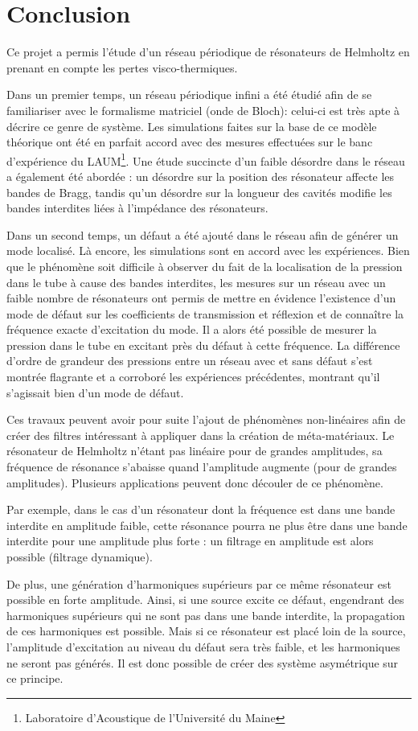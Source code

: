 \chapter{Conclusion}

Ce projet a permis l'étude d'un réseau périodique de résonateurs de Helmholtz en prenant en compte les pertes visco-thermiques. 

Dans un premier temps, un réseau périodique infini a été étudié afin de se familiariser avec le formalisme matriciel (onde de Bloch): celui-ci est très apte à décrire ce genre de système. Les simulations faites sur la base de ce modèle théorique ont été en parfait accord avec des mesures effectuées sur le banc d'expérience du LAUM\footnote{\samepage Laboratoire d'Acoustique de l'Université du Maine}. Une étude succincte d'un faible désordre dans le réseau a également été abordée : un désordre sur la position des résonateur affecte les bandes de Bragg, tandis qu'un désordre sur la longueur des cavités modifie les bandes interdites liées à l'impédance des résonateurs.

 
Dans un second temps, un défaut a été ajouté dans le réseau afin de générer un mode localisé. Là encore, les simulations sont en accord avec les expériences. Bien que le phénomène soit difficile à observer du fait de la localisation de la pression dans le tube à cause des bandes interdites, les mesures sur un réseau avec un faible nombre de résonateurs ont permis de mettre en évidence l’existence d'un mode de défaut sur les coefficients de transmission et réflexion et de connaître la fréquence exacte d’excitation du mode. Il a alors été possible de mesurer la pression dans le tube en excitant près du défaut à cette fréquence. La différence d'ordre de grandeur des pressions entre un réseau avec et sans défaut s'est montrée flagrante et a corroboré les expériences précédentes, montrant qu'il s'agissait bien d'un mode de défaut.

Ces travaux peuvent avoir pour suite l'ajout de phénomènes non-linéaires afin de créer des filtres intéressant à appliquer dans la création de méta-matériaux. Le résonateur de Helmholtz n'étant pas linéaire pour de grandes amplitudes, sa fréquence de résonance s'abaisse quand l'amplitude augmente (pour de grandes amplitudes). Plusieurs applications peuvent donc découler de ce phénomène.

Par exemple, dans le cas d'un résonateur dont la fréquence est dans une bande interdite en amplitude faible, cette résonance pourra ne plus être dans une bande interdite pour une amplitude plus forte : un filtrage en amplitude est alors possible (filtrage dynamique).


De plus, une génération d'harmoniques supérieurs par ce même résonateur est possible en forte amplitude. Ainsi, si une source excite ce défaut, engendrant des harmoniques supérieurs qui ne sont pas dans une bande interdite, la propagation de ces harmoniques est possible. Mais si ce résonateur est placé loin de la source, l'amplitude d'excitation au niveau du défaut sera très faible, et les harmoniques ne seront pas générés. Il est donc possible de créer des système asymétrique sur ce principe.








